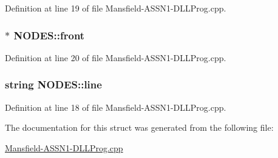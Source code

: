 Definition at line 19 of file Mansfield-\/ASSN1-\/DLLProg.cpp.

\hypertarget{struct_n_o_d_e_s_a6620bfdf0352db36979260789d54f583}{
\subsubsection[{front}]{$\ast$ {\bf NODES::front}}}
\label{struct_n_o_d_e_s_a6620bfdf0352db36979260789d54f583}


Definition at line 20 of file Mansfield-\/ASSN1-\/DLLProg.cpp.

\hypertarget{struct_n_o_d_e_s_ae8b9b97e43bab5b3608363d525259390}{
\subsubsection[{line}]{\setlength{\rightskip}{0pt plus 5cm}string {\bf NODES::line}}}
\label{struct_n_o_d_e_s_ae8b9b97e43bab5b3608363d525259390}


Definition at line 18 of file Mansfield-\/ASSN1-\/DLLProg.cpp.



The documentation for this struct was generated from the following file:\begin{DoxyCompactItemize}
\item 
\hyperlink{_mansfield-_a_s_s_n1-_d_l_l_prog_8cpp}{Mansfield-\/ASSN1-\/DLLProg.cpp}\end{DoxyCompactItemize}
